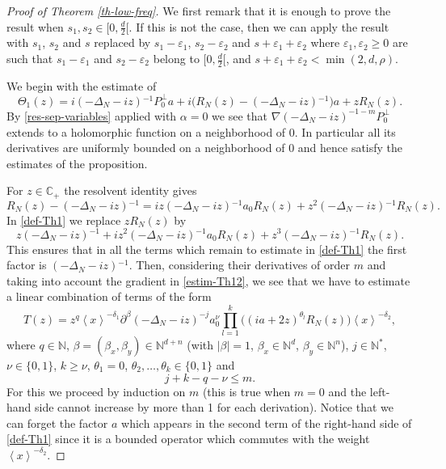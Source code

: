 \documentclass[10pt, a4paper,reqno]{amsart}
\theoremstyle{plain}
\theoremstyle{definition}
\theoremstyle{remark}
\begin{document}
\begin{proof}[Proof of Theorem \ref{th-low-freq}]
{\noindent {\bf $\bullet$}\quad } We first remark that it is enough to prove the result when $s_1,s_2 \in \big[0,\frac d 2 \big[$. If this is not the case, then we can apply the result with $s_1$, $s_2$ and $s$ replaced by $s_1 - {\varepsilon}_1$, $s_2 - {\varepsilon}_2$ and $s + {\varepsilon}_1 + {\varepsilon}_2$ where ${\varepsilon}_1,{\varepsilon}_2 {\geqslant} 0$ are such that $s_1 -{\varepsilon}_1$ and $s_2 - {\varepsilon}_2$ belong to $\big[0,\frac d 2 \big[$, and $s + {\varepsilon}_1 + {\varepsilon}_2 < \min(2,d,\rho)$.

{\noindent {\bf $\bullet$}\quad } We begin with the estimate of
\begin{equation} \label{def-Th1}
{\Theta}_1(z) = i (-{{\Delta}_N} - iz){^{-1}} P_0^\bot a + i \big( {R_N(z)} - {{(-{{\Delta}_N} -iz){^{-1}}}} \big) a + z {R_N(z)}.
\end{equation}
By \eqref{res-sep-variables} applied with ${\alpha} = 0$ we see that $\nabla (-{{\Delta}_N} - iz)^{-1-m} P_0^\bot$ extends to a holomorphic function on a neighborhood of 0. In particular all its derivatives are uniformly bounded on a neighborhood of 0 and hence satisfy the estimates of the proposition.

{\noindent {\bf $\bullet$}\quad } For $z \in {\mathbb{C}}_+$ the resolvent identity gives 
\[
{R_N(z)} - {{(-{{\Delta}_N} -iz){^{-1}}}} = iz {{(-{{\Delta}_N} -iz){^{-1}}}} a_0 {R_N(z)} + z^2 {{(-{{\Delta}_N} -iz){^{-1}}}} {R_N(z)}.
\]
In \eqref{def-Th1} we replace $z {R_N(z)}$ by 
\[
z {{(-{{\Delta}_N} -iz){^{-1}}}} + iz^2 {{(-{{\Delta}_N} -iz){^{-1}}}} a_0 {R_N(z)} + z^3 {{(-{{\Delta}_N} -iz){^{-1}}}} {R_N(z)}. 
\]
This ensures that in all the terms which remain to estimate in \eqref{def-Th1} the first factor is ${{(-{{\Delta}_N} -iz){^{-1}}}}$. Then, considering their derivatives of order $m$ and taking into account the gradient in \eqref{estim-Th12}, we see that we have to estimate a linear combination of terms of the form 
\begin{equation} \label{def-T}
T(z) = z^q {\left< x \right>}^{-{\delta}_1} \partial^{\beta} (-{{\Delta}_N}-iz)^{-j} a_0^{\nu}  \prod_{l=1}^k \big((ia+2z)^{{\theta}_l} {R_N(z)} \big) {\left< x \right>}^{-{\delta}_2},
\end{equation}
where $q \in {\mathbb{N}}$, ${\beta} = ({\beta}_x,{\beta}_y) \in {\mathbb{N}}^{d+n}$ (with ${\left\vert {\beta}\right\vert} = 1$, ${\beta}_x \in {\mathbb{N}}^d$, ${\beta}_y \in {\mathbb{N}}^n$), $j \in {\mathbb{N}}^*$, ${\nu} \in \{0,1\}$, $k {\geqslant} {\nu}$, ${\theta}_1 = 0$, ${\theta}_2,\dots,{\theta}_k \in \{0,1\}$ and
\begin{equation} \label{ineq-m}
j + k - q - {\nu} {\leqslant} m.
\end{equation}
For this we proceed by induction on $m$ (this is true when $m = 0$ and the left-hand side cannot increase by more than 1 for each derivation). Notice that we can forget the factor $a$ which appears in the second term of the right-hand side of \eqref{def-Th1} since it is a bounded operator which commutes with the weight ${\left< x \right>}^{-{\delta}_2}$.


\end{proof}
\end{document}
